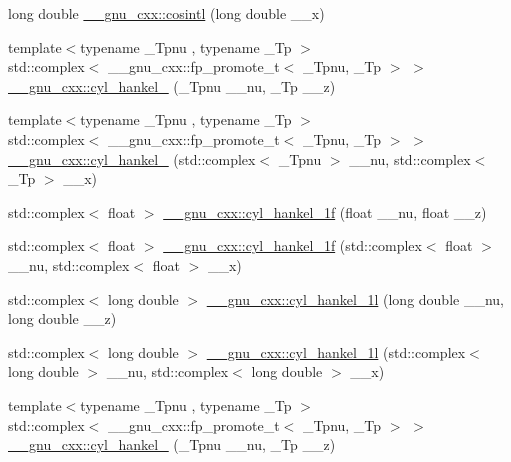 \begin{DoxyCompactItemize}
\item 
long double \hyperlink{group__mathsf__gnu_ga5f01f17ae8859129860118b09d51791c}{\+\_\+\+\_\+gnu\+\_\+cxx\+::cosintl} (long double \+\_\+\+\_\+x)
\item 
{\footnotesize template$<$typename \+\_\+\+Tpnu , typename \+\_\+\+Tp $>$ }\\std\+::complex$<$ \+\_\+\+\_\+gnu\+\_\+cxx\+::fp\+\_\+promote\+\_\+t$<$ \+\_\+\+Tpnu, \+\_\+\+Tp $>$ $>$ \hyperlink{group__mathsf__gnu_ga5329bba77d10a9d2f15d9bbe43a70db3}{\+\_\+\+\_\+gnu\+\_\+cxx\+::cyl\+\_\+hankel\+\_} (\+\_\+\+Tpnu \+\_\+\+\_\+nu, \+\_\+\+Tp \+\_\+\+\_\+z)
\item 
{\footnotesize template$<$typename \+\_\+\+Tpnu , typename \+\_\+\+Tp $>$ }\\std\+::complex$<$ \+\_\+\+\_\+gnu\+\_\+cxx\+::fp\+\_\+promote\+\_\+t$<$ \+\_\+\+Tpnu, \+\_\+\+Tp $>$ $>$ \hyperlink{group__mathsf__gnu_ga2f111212d3ec713625acb6986daa925f}{\+\_\+\+\_\+gnu\+\_\+cxx\+::cyl\+\_\+hankel\+\_} (std\+::complex$<$ \+\_\+\+Tpnu $>$ \+\_\+\+\_\+nu, std\+::complex$<$ \+\_\+\+Tp $>$ \+\_\+\+\_\+x)
\item 
std\+::complex$<$ float $>$ \hyperlink{group__mathsf__gnu_ga89758ed03e56567baa62b90cc4784f71}{\+\_\+\+\_\+gnu\+\_\+cxx\+::cyl\+\_\+hankel\+\_\+1f} (float \+\_\+\+\_\+nu, float \+\_\+\+\_\+z)
\item 
std\+::complex$<$ float $>$ \hyperlink{group__mathsf__gnu_ga810e021a3f11c1b2253c15c6f4d41143}{\+\_\+\+\_\+gnu\+\_\+cxx\+::cyl\+\_\+hankel\+\_\+1f} (std\+::complex$<$ float $>$ \+\_\+\+\_\+nu, std\+::complex$<$ float $>$ \+\_\+\+\_\+x)
\item 
std\+::complex$<$ long double $>$ \hyperlink{group__mathsf__gnu_gacb49c66b4267fbc56906db02f14365f2}{\+\_\+\+\_\+gnu\+\_\+cxx\+::cyl\+\_\+hankel\+\_\+1l} (long double \+\_\+\+\_\+nu, long double \+\_\+\+\_\+z)
\item 
std\+::complex$<$ long double $>$ \hyperlink{group__mathsf__gnu_ga6900f79ec70673bcb001538aec74e07c}{\+\_\+\+\_\+gnu\+\_\+cxx\+::cyl\+\_\+hankel\+\_\+1l} (std\+::complex$<$ long double $>$ \+\_\+\+\_\+nu, std\+::complex$<$ long double $>$ \+\_\+\+\_\+x)
\item 
{\footnotesize template$<$typename \+\_\+\+Tpnu , typename \+\_\+\+Tp $>$ }\\std\+::complex$<$ \+\_\+\+\_\+gnu\+\_\+cxx\+::fp\+\_\+promote\+\_\+t$<$ \+\_\+\+Tpnu, \+\_\+\+Tp $>$ $>$ \hyperlink{group__mathsf__gnu_ga7ebc71dd48ac97255d72f5f5f43dfd8e}{\+\_\+\+\_\+gnu\+\_\+cxx\+::cyl\+\_\+hankel\+\_} (\+\_\+\+Tpnu \+\_\+\+\_\+nu, \+\_\+\+Tp \+\_\+\+\_\+z)

\end{DoxyCompactItemize}
